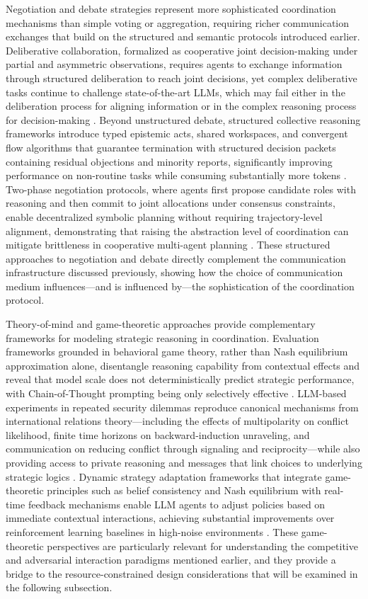 \documentclass[11pt]{article}
\begin{document}
Negotiation and debate strategies represent more sophisticated coordination mechanisms than simple voting or aggregation, requiring richer communication exchanges that build on the structured and semantic protocols introduced earlier. Deliberative collaboration, formalized as cooperative joint decision-making under partial and asymmetric observations, requires agents to exchange information through structured deliberation to reach joint decisions, yet complex deliberative tasks continue to challenge state-of-the-art LLMs, which may fail either in the deliberation process for aligning information or in the complex reasoning process for decision-making \cite{ref85}. Beyond unstructured debate, structured collective reasoning frameworks introduce typed epistemic acts, shared workspaces, and convergent flow algorithms that guarantee termination with structured decision packets containing residual objections and minority reports, significantly improving performance on non-routine tasks while consuming substantially more tokens \cite{ref86}. Two-phase negotiation protocols, where agents first propose candidate roles with reasoning and then commit to joint allocations under consensus constraints, enable decentralized symbolic planning without requiring trajectory-level alignment, demonstrating that raising the abstraction level of coordination can mitigate brittleness in cooperative multi-agent planning \cite{ref87}. These structured approaches to negotiation and debate directly complement the communication infrastructure discussed previously, showing how the choice of communication medium influences---and is influenced by---the sophistication of the coordination protocol.

Theory-of-mind and game-theoretic approaches provide complementary frameworks for modeling strategic reasoning in coordination. Evaluation frameworks grounded in behavioral game theory, rather than Nash equilibrium approximation alone, disentangle reasoning capability from contextual effects and reveal that model scale does not deterministically predict strategic performance, with Chain-of-Thought prompting being only selectively effective \cite{ref88}. LLM-based experiments in repeated security dilemmas reproduce canonical mechanisms from international relations theory---including the effects of multipolarity on conflict likelihood, finite time horizons on backward-induction unraveling, and communication on reducing conflict through signaling and reciprocity---while also providing access to private reasoning and messages that link choices to underlying strategic logics \cite{ref89}. Dynamic strategy adaptation frameworks that integrate game-theoretic principles such as belief consistency and Nash equilibrium with real-time feedback mechanisms enable LLM agents to adjust policies based on immediate contextual interactions, achieving substantial improvements over reinforcement learning baselines in high-noise environments \cite{ref90}. These game-theoretic perspectives are particularly relevant for understanding the competitive and adversarial interaction paradigms mentioned earlier, and they provide a bridge to the resource-constrained design considerations that will be examined in the following subsection.
\end{document}
